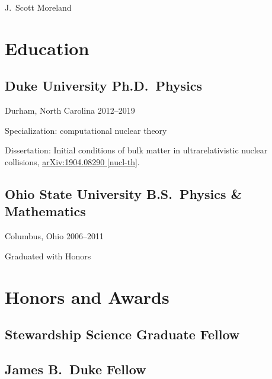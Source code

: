 \documentclass[letterpaper,10pt]{article}
\begin{document}
\newcommand{\link}[3]{{\color[gray]{.6}{#1}\enspace\href{#2}{#3}}}
\newcommand{\sep}{{\enspace\textperiodcentered\enspace}}

\begin{center}
  \huge\raleway J.\ Scott Moreland
\end{center}

\smallskip

\newcommand{\subheading}[3]{{\small #1 \hfill #2--#3}}

\begin{multicols}{2}


\section{Education}

\subsection{Duke University \hfill Ph.D.\ Physics}
\subheading{Durham, North Carolina}{2012}{2019}

Specialization: computational nuclear theory

\smallskip

Dissertation: Initial conditions of bulk matter in ultrarelativistic nuclear collisions,
\href{https://arxiv.org/abs/1904.08290}{arXiv:1904.08290 [nucl-th]}.

\subsection{Ohio State University \hfill B.S.\ Physics \& Mathematics}
\subheading{Columbus, Ohio}{2006}{2011}

Graduated with Honors

\section{Honors and Awards}

\subsection{Stewardship Science Graduate Fellow}

\subsection{James B.\ Duke Fellow}


\end{multicols}
\end{document}
